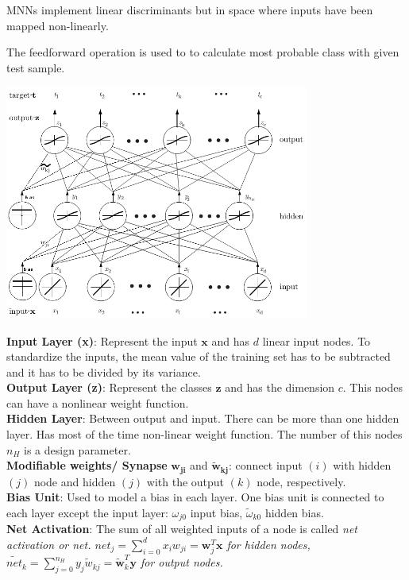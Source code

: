   MNNs implement linear discriminants but in space where inputs have been mapped non-linearly.
 
 The feedforward operation is used to to calculate most probable class with given test sample.\\
 \begin{minipage}{10cm}
 \includegraphics[width=10cm]{./images/feedforwardOperation.png}
 \end{minipage} 
 \hspace{5mm}
 \begin{minipage}{8cm}
  \textbf{Input Layer (x)}: Represent the input $\bm{ x}$ and has $d$ linear input nodes. 
  To standardize the inputs, the mean value of the training set has to be subtracted and it has to 
  be divided by its variance.\\
  \textbf{Output Layer (z)}: Represent the classes $\bm{ z}$ and has the dimension $c$. This nodes can have a nonlinear weight function.\\
  \textbf{Hidden Layer}: Between output and input. There can be more than one hidden layer. 
  Has most of the time non-linear weight function. The number of this nodes $n_H$ is a design parameter.\\
  \textbf{Modifiable weights/ Synapse} $\bm{ w_{ji}}$ and  $\bm{\tilde{w}_{kj}}$: 
  connect input $(i)$ with hidden $(j)$ node and hidden $(j)$ with the output $(k)$ node, respectively.  \\
  \textbf{Bias Unit}: Used to model a bias in each layer. One bias unit is connected to each layer except the input layer: 
  $\omega_{j0}$ input bias, $\tilde \omega_{k0}$ hidden bias.\\
  \textbf{Net Activation}: The sum of all weighted inputs of a node is called \em net activation \em or \em net\em. 
  $ net_j =\sum\limits_{i=0}^d x_i w_{ji} = \bm w_j^T\bm x$ for hidden nodes,
  $ \tilde{net}_k =\sum\limits_{j=0}^{n_H} y_j \tilde{w}_{kj} = \bm{ \tilde{w}}_k^T\bm y$ for output nodes.\\
 \end{minipage}\\
